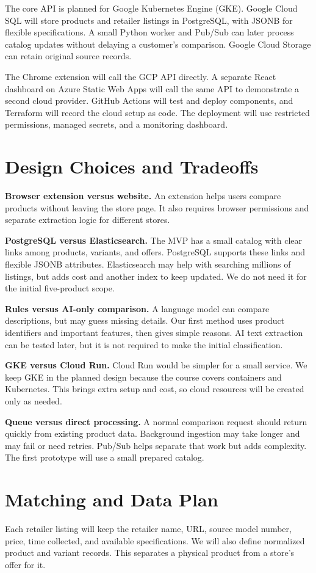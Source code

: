 \documentclass[conference,10pt]{IEEEtran}
\begin{document}
The core API is planned for Google Kubernetes Engine (GKE). Google Cloud SQL will store products and retailer listings in PostgreSQL, with JSONB for flexible specifications. A small Python worker and Pub/Sub can later process catalog updates without delaying a customer's comparison. Google Cloud Storage can retain original source records.

The Chrome extension will call the GCP API directly. A separate React dashboard on Azure Static Web Apps will call the same API to demonstrate a second cloud provider. GitHub Actions will test and deploy components, and Terraform will record the cloud setup as code. The deployment will use restricted permissions, managed secrets, and a monitoring dashboard.

\section{Design Choices and Tradeoffs}
\textbf{Browser extension versus website.} An extension helps users compare products without leaving the store page. It also requires browser permissions and separate extraction logic for different stores.

\textbf{PostgreSQL versus Elasticsearch.} The MVP has a small catalog with clear links among products, variants, and offers. PostgreSQL supports these links and flexible JSONB attributes. Elasticsearch may help with searching millions of listings, but adds cost and another index to keep updated. We do not need it for the initial five-product scope.

\textbf{Rules versus AI-only comparison.} A language model can compare descriptions, but may guess missing details. Our first method uses product identifiers and important features, then gives simple reasons. AI text extraction can be tested later, but it is not required to make the initial classification.

\textbf{GKE versus Cloud Run.} Cloud Run would be simpler for a small service. We keep GKE in the planned design because the course covers containers and Kubernetes. This brings extra setup and cost, so cloud resources will be created only as needed.

\textbf{Queue versus direct processing.} A normal comparison request should return quickly from existing product data. Background ingestion may take longer and may fail or need retries. Pub/Sub helps separate that work but adds complexity. The first prototype will use a small prepared catalog.

\section{Matching and Data Plan}
Each retailer listing will keep the retailer name, URL, source model number, price, time collected, and available specifications. We will also define normalized product and variant records. This separates a physical product from a store's offer for it.
\end{document}
